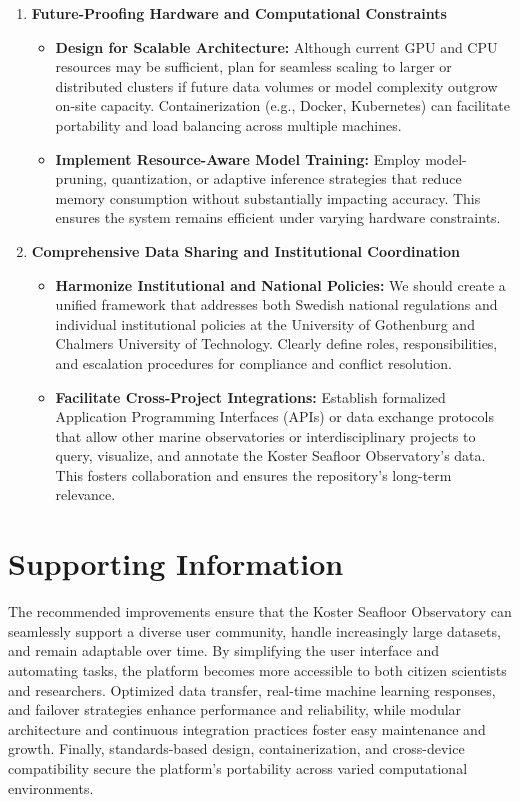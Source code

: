 \begin{enumerate}
    \item \textbf{Future-Proofing Hardware and Computational Constraints}
      \begin{itemize}
        \item \textbf{Design for Scalable Architecture:} Although current GPU and CPU resources may be sufficient, plan for seamless scaling to larger or distributed clusters if future data volumes or model complexity outgrow on-site capacity. Containerization (e.g., Docker, Kubernetes) can facilitate portability and load balancing across multiple machines.
        \item \textbf{Implement Resource-Aware Model Training:} Employ model-pruning, quantization, or adaptive inference strategies that reduce memory consumption without substantially impacting accuracy. This ensures the system remains efficient under varying hardware constraints.
      \end{itemize}
  
    \item \textbf{Comprehensive Data Sharing and Institutional Coordination}
      \begin{itemize}
        \item \textbf{Harmonize Institutional and National Policies:} We should create a unified framework that addresses both Swedish national regulations and individual institutional policies at the University of Gothenburg and Chalmers University of Technology. Clearly define roles, responsibilities, and escalation procedures for compliance and conflict resolution.
        \item \textbf{Facilitate Cross-Project Integrations:} Establish formalized Application Programming Interfaces (APIs) or data exchange protocols that allow other marine observatories or interdisciplinary projects to query, visualize, and annotate the Koster Seafloor Observatory’s data. This fosters collaboration and ensures the repository’s long-term relevance.
      \end{itemize}
  
  \end{enumerate}  


\section{Supporting Information}

The recommended improvements ensure that the Koster Seafloor Observatory can seamlessly support a diverse user community, handle increasingly large datasets, and remain adaptable over time. By simplifying the user interface and automating tasks, the platform becomes more accessible to both citizen scientists and researchers. Optimized data transfer, real-time machine learning responses, and failover strategies enhance performance and reliability, while modular architecture and continuous integration practices foster easy maintenance and growth. Finally, standards-based design, containerization, and cross-device compatibility secure the platform’s portability across varied computational environments.